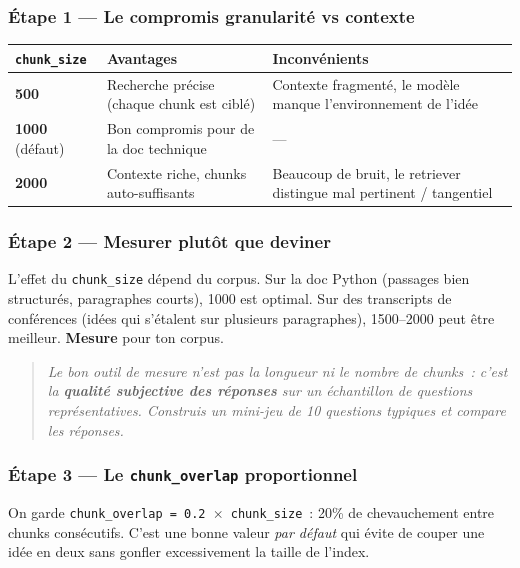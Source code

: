 \documentclass[11pt,a4paper]{article}
\begin{document}
\subsubsection*{Étape 1 — Le compromis granularité vs contexte}

\begin{center}
\begin{tabular}{p{2.5cm} p{5cm} p{5cm}}
\toprule
\textbf{\texttt{chunk\_size}} & \textbf{Avantages} & \textbf{Inconvénients} \\
\midrule
\textbf{500}
& Recherche précise (chaque chunk est ciblé)
& Contexte fragmenté, le modèle manque l'environnement de l'idée \\[1mm]
\textbf{1000} (défaut)
& Bon compromis pour de la doc technique
& — \\[1mm]
\textbf{2000}
& Contexte riche, chunks auto-suffisants
& Beaucoup de bruit, le retriever distingue mal pertinent / tangentiel \\
\bottomrule
\end{tabular}
\end{center}

\subsubsection*{Étape 2 — Mesurer plutôt que deviner}

L'effet du \texttt{chunk\_size} dépend du corpus. Sur la doc Python
(passages bien structurés, paragraphes courts), 1000 est optimal. Sur
des transcripts de conférences (idées qui s'étalent sur plusieurs
paragraphes), 1500--2000 peut être meilleur. \textbf{Mesure} pour ton
corpus.

\begin{quote}\itshape
Le bon outil de mesure n'est pas la longueur ni le nombre de chunks~:
c'est la \textbf{qualité subjective des réponses} sur un échantillon
de questions représentatives. Construis un mini-jeu de 10 questions
typiques et compare les réponses.
\end{quote}

\subsubsection*{Étape 3 — Le \texttt{chunk\_overlap} proportionnel}

On garde \texttt{chunk\_overlap = 0.2 \(\times\) chunk\_size}~: 20\%
de chevauchement entre chunks consécutifs. C'est une bonne valeur
\emph{par défaut} qui évite de couper une idée en deux sans gonfler
excessivement la taille de l'index.
\end{document}
